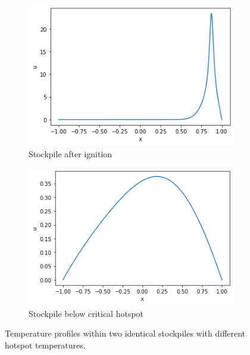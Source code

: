 \begin{figure}[h!]
\centering
\begin{subfigure}{.5\textwidth}
  \centering
  \includegraphics[width=\linewidth]{figures/NDA/Hotspot/Sample.png}  
  \caption{Stockpile after ignition}
  \label{fig:hot:ignited}
\end{subfigure}%
\begin{subfigure}{.5\textwidth}
  \centering
  \includegraphics[width=\linewidth]{figures/NDA/Hotspot/Sample_sub.png}  
  \caption{Stockpile below critical hotspot}
  \label{fig:hot:sub}
\end{subfigure}
\caption{Temperature profiles within two identical stockpiles with different hotspot temperatures.}
\label{fig:hot:sample}
\end{figure}


